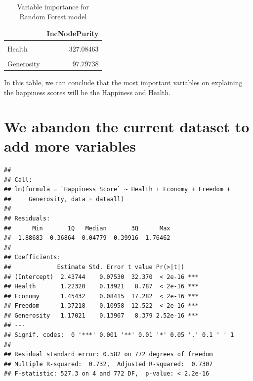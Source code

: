 \documentclass[11pt,a4paper,]{article}
\begin{document}
\begin{table}

\caption{\label{tab:unnamed-chunk-8}Variable importance for Random Forest model}
\centering
\begin{tabular}[t]{l|r}
\hline
  & IncNodePurity\\
\hline
\cellcolor{gray!6}{Economy} & \cellcolor{gray!6}{348.66900}\\
\hline
Health & 327.08463\\
\hline
\cellcolor{gray!6}{Freedom} & \cellcolor{gray!6}{169.32991}\\
\hline
Generosity & 97.79738\\
\hline
\end{tabular}
\end{table}

In this table, we can conclude that the most important variables on explaining the happiness scores will be the Happiness and Health.

\hypertarget{we-abandon-the-current-dataset-to-add-more-variables}{%
\section{We abandon the current dataset to add more variables}\label{we-abandon-the-current-dataset-to-add-more-variables}}

\begin{verbatim}
## 
## Call:
## lm(formula = `Happiness Score` ~ Health + Economy + Freedom + 
##     Generosity, data = dataall)
## 
## Residuals:
##      Min       1Q   Median       3Q      Max 
## -1.88683 -0.36864  0.04779  0.39916  1.76462 
## 
## Coefficients:
##             Estimate Std. Error t value Pr(>|t|)    
## (Intercept)  2.43744    0.07530  32.370  < 2e-16 ***
## Health       1.22320    0.13921   8.787  < 2e-16 ***
## Economy      1.45432    0.08415  17.282  < 2e-16 ***
## Freedom      1.37218    0.10958  12.522  < 2e-16 ***
## Generosity   1.17021    0.13967   8.379 2.52e-16 ***
## ---
## Signif. codes:  0 '***' 0.001 '**' 0.01 '*' 0.05 '.' 0.1 ' ' 1
## 
## Residual standard error: 0.582 on 772 degrees of freedom
## Multiple R-squared:  0.732,  Adjusted R-squared:  0.7307 
## F-statistic: 527.3 on 4 and 772 DF,  p-value: < 2.2e-16
\end{verbatim}
\end{document}
